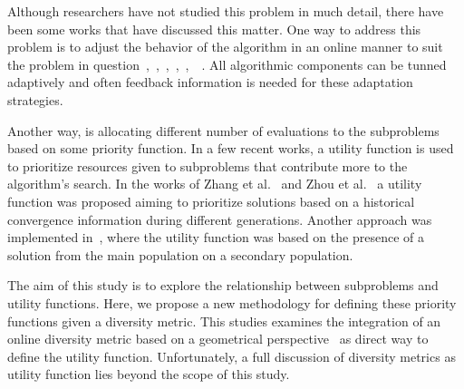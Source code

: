 
Although researchers have not studied this problem in much detail, there have been some works that have discussed this matter. One way to address this problem is to adjust the behavior of the algorithm in an online manner to suit the problem in question~\cite{hinterding1997adaptation},~\cite{de2007parameter},~\cite{meyer2007self},~\cite{zhang2009performance},~\cite{kramer2010evolutionary},~\cite{zhang2012survey}~\cite{cai2015external}. All algorithmic components can be tunned adaptively and often feedback information is needed for these adaptation strategies. 

Another way, is  allocating different number of evaluations to the subproblems based on some priority function. In a few recent works, a utility function is used to prioritize resources given to subproblems that contribute more to the algorithm's search.  In the works of Zhang et al.~\cite{zhang2009performance} and Zhou et al.~\cite{zhou2016all} a utility function was proposed aiming to prioritize solutions based on a historical convergence information during different generations. Another approach was implemented in~\cite{kang2018collaborative}, where the utility function was based on the presence of a solution from the main population on a secondary population.

The aim of this study is to explore the relationship between subproblems and utility functions. Here, we propose a new methodology for defining these priority functions given a diversity metric. This studies examines the integration of an online diversity metric based on a geometrical perspective~\cite{gee2015online} as direct way to define the utility function. Unfortunately, a full discussion of diversity metrics as utility function lies beyond the scope of this study.




